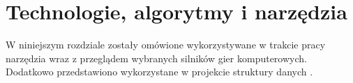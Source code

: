 \chapter{Technologie, algorytmy i narzędzia}
W niniejszym rozdziale zostały omówione wykorzystywane w trakcie pracy narzędzia wraz z przeglądem wybranych silników
gier komputerowych. Dodatkowo przedstawiono wykorzystane w projekcie struktury danych .
